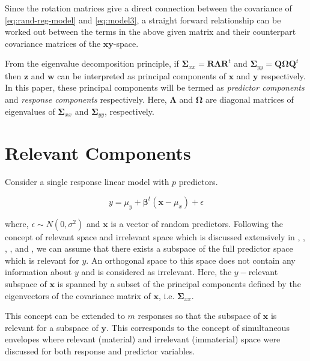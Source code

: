 \documentclass[review]{elsarticle}
\theoremstyle{definition}
\theoremstyle{definition}
\theoremstyle{definition}
\theoremstyle{remark}
\begin{document}
Since the rotation matrices give a direct connection between the
covariance of \eqref{eq:rand-reg-model} and \eqref{eq:model3}, a straight
forward relationship can be worked out between the terms in the above
given matrix and their counterpart covariance matrices of the
\(\mathbf{xy}\)-space.

From the eigenvalue decomposition principle, if
\(\boldsymbol{\Sigma}_{xx} = \mathbf{R}\boldsymbol{\Lambda}\mathbf{R}^t\)
and
\(\boldsymbol{\Sigma}_{yy} = \mathbf{Q}\boldsymbol{\Omega}\mathbf{Q}^t\)
then \(\mathbf{z}\) and \(\mathbf{w}\) can be interpreted as principal
components of \(\mathbf{x}\) and \(\mathbf{y}\) respectively. In this
paper, these principal components will be termed as \emph{predictor
components} and \emph{response components} respectively. Here,
\(\boldsymbol{\Lambda}\) and \(\boldsymbol{\Omega}\) are diagonal
matrices of eigenvalues of \(\boldsymbol{\Sigma}_{xx}\) and
\(\boldsymbol{\Sigma}_{yy}\), respectively.

\section{Relevant Components}\label{relevant-components}

Consider a single response linear model with \(p\) predictors.

\[y = \mu_y + \boldsymbol{\beta}^t\left(\mathbf{x} - \mu_x\right) + \epsilon\]

where, \(\epsilon \sim N(0, \sigma^2)\) and \(\mathbf{x}\) is a vector
of random predictors. Following the concept of relevant space and
irrelevant space which is discussed extensively in
\citet{helland1994comparison}, \citet{Helland2000},
\citet{helland2012near}, \citet{cook2013envelopes}, and
\citet{saebo2015simrel}, we can assume that there exists a subspace of
the full predictor space which is relevant for \(y\). An orthogonal
space to this space does not contain any information about \(y\) and is
considered as irrelevant. Here, the \(y-\)relevant subspace of
\(\mathbf{x}\) is spanned by a subset of the principal components
defined by the eigenvectors of the covariance matrix of \(\mathbf{x}\),
i.e. \(\boldsymbol{\Sigma}_{xx}\).

This concept can be extended to \(m\) responses so that the subspace of
\(\mathbf{x}\) is relevant for a subspace of \(\mathbf{y}\). This
corresponds to the concept of simultaneous envelopes
\citep{cook2015simultaneous} where relevant (material) and irrelevant
(immaterial) space were discussed for both response and predictor
variables.
\end{document}
